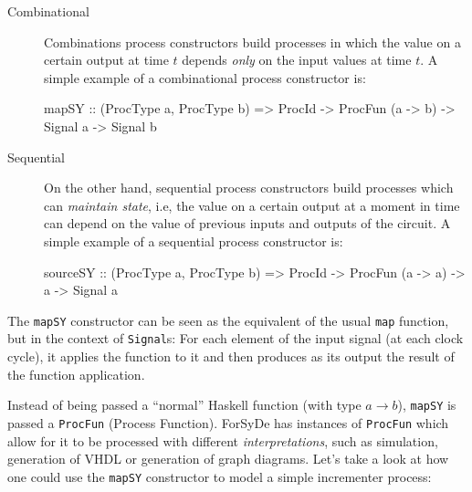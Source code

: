             \begin{description}

                \item[Combinational] Combinations process constructors build processes in which the
                    value on a certain output at time $t$ depends \emph{only} on the input values at
                    time $t$. A simple example of a combinational process constructor is:

                    \begin{haskellcode}
        mapSY :: (ProcType a, ProcType b) => ProcId
              -> ProcFun (a -> b) -> Signal a -> Signal b
                    \end{haskellcode}

                \item[Sequential] On the other hand, sequential process constructors build processes
                    which can \emph{maintain state}, i.e, the value on a certain output at a moment
                    in time can depend on the value of previous inputs and outputs of the circuit. A
                    simple example of a sequential process constructor is:

                    \begin{haskellcode}
        sourceSY :: (ProcType a, ProcType b) => ProcId
                 -> ProcFun (a -> a) -> a -> Signal a
                    \end{haskellcode}

            \end{description}

            The \texttt{mapSY} constructor can be seen as the equivalent of the usual \texttt{map}
            function, but in the context of \texttt{Signal}s: For each element of the input signal
            (at each clock cycle), it applies the function to it and then produces as its output the
            result of the function application.

            Instead of being passed a ``normal'' Haskell function (with type $a → b$),
            \texttt{mapSY} is passed a \texttt{ProcFun} (Process Function). ForSyDe has instances of
            \texttt{ProcFun} which allow for it to be processed with different
            \emph{interpretations}, such as simulation, generation of VHDL or generation of graph
            diagrams. Let's take a look at how one could use the \texttt{mapSY} constructor to model
            a simple incrementer process:

